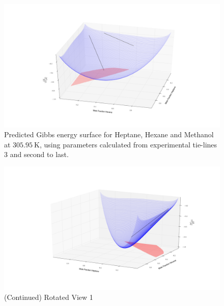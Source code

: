 \begin{figure}[hp]
 \vspace{40pt}
\centering
\includegraphics[width = \textwidth, bb=100 100 1600 700]{Results_Parts/TernaryParams/heptane-hexane-methanol/DWPMTieline3and-2/rotation6.png}
\caption{Predicted Gibbs energy surface for Heptane, Hexane and Methanol at $305.95~\mathrm{K}$, using parameters calculated from experimental tie-lines 3 and second to last.}
\end{figure}	

\begin{figure}[hp]
\vspace{40pt}
\ContinuedFloat
\centering
\includegraphics[width = \textwidth, bb=100 100 1600 700]{Results_Parts/TernaryParams/heptane-hexane-methanol/DWPMTieline3and-2/rotation2.png}
\caption[]{(Continued) Rotated View 1}
\end{figure}

